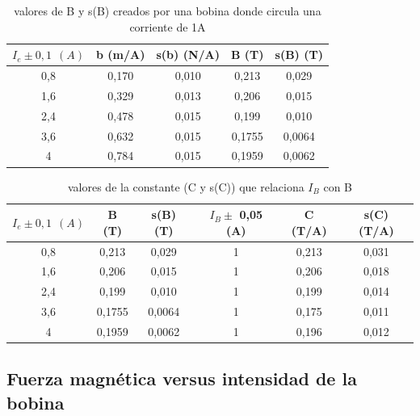 \documentclass[12pt,a4paper]{book}
\begin{document}
\begin{table}[h!]
\begin{center}
\begin{tabular}{|c|c|c|c|c|}
\hline
$I_e \pm 0,1 \ \  (A)$ & 	 b    (m/A) & 	 s(b)  (N/A) & 	 B   (T) & 	 s(B)   (T) \\ \hline
0,8 & 	 0,170 & 	 0,010 & 	 0,213 & 	 0,029 \\ 
1,6 & 	 0,329 & 	 0,013 & 	 0,206 & 	 0,015 \\ 
2,4 & 	 0,478 & 	 0,015 & 	 0,199 & 	 0,010 \\ 
3,6 & 	 0,632 & 	 0,015 & 	 0,1755 & 	 0,0064 \\ 
4 & 	 0,784 & 	 0,015 & 	 0,1959 & 	 0,0062 \\ 
\hline
\end{tabular}
\caption{valores de B y s(B) creados por una bobina donde circula una corriente de 1A }
\label{Tab:balanza-valor-B-l}
\end{center}
\end{table}

\newpage

\vspace*{1.0cm}

\begin{table}[h!]
\begin{center}
\begin{tabular}{|c|c|c|c|c|c|}
\hline
$I_e \pm 0,1 \ \  (A)$ & 	 B   (T) & 	 s(B)   (T) & 	$ I_B \pm$ 0,05 (A) & 	 C (T/A) & 	 s(C) (T/A) \\ \hline
0,8 & 	 0,213 & 	 0,029 & 	 1 & 	 0,213 & 	 0,031 \\ 
1,6 & 	 0,206 & 	 0,015 & 	 1 & 	 0,206 & 	 0,018 \\ 
2,4 & 	 0,199 & 	 0,010 & 	 1 & 	 0,199 & 	 0,014 \\ 
3,6 & 	 0,1755 & 	 0,0064 & 	 1 & 	 0,175 & 	 0,011 \\ 
4 & 	 0,1959 & 	 0,0062 & 	 1 & 	 0,196 & 	 0,012 \\ 
\hline
\end{tabular}
\caption{valores de la constante (C y s(C)) que relaciona $I_B$ con B }
\label{Tab:balanza-valor-cte--l}
\end{center}
\end{table}


\vspace*{1.5cm}


\subsection{Fuerza magnética versus intensidad de la bobina}
\end{document}
